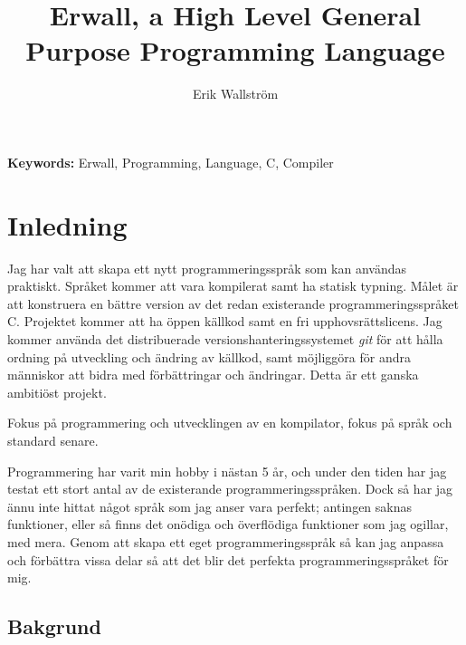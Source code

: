 \documentclass{theme}
\begin{document}
\title{Erwall, a High Level General Purpose Programming Language}
\subtitle{}
\author{Erik Wallström}
\maketitle
\newpage

\begin{abstract}
\end{abstract}

\begin{flushleft}
	{\small {\bf Keywords:} Erwall, Programming, Language, C, Compiler}
\end{flushleft}

\tableofcontents
{}
\newpage
{}

\section{Inledning}

Jag har valt att skapa ett nytt programmeringsspråk som kan användas praktiskt. 
Språket kommer att vara kompilerat samt ha statisk typning. Målet är att 
konstruera en bättre version av det redan existerande programmeringsspråket C. 
Projektet kommer att ha öppen källkod samt en fri upphovsrättslicens. Jag kommer
använda det distribuerade versionshanteringssystemet \textit{git} för att hålla 
ordning på utveckling och ändring av källkod, samt möjliggöra för andra 
människor att bidra med förbättringar och ändringar. Detta är ett ganska 
ambitiöst projekt.

Fokus på programmering och utvecklingen av en kompilator, fokus på språk och 
standard senare. 

Programmering har varit min hobby i nästan 5 år, och under den tiden har jag 
testat ett stort antal av de existerande programmeringsspråken. Dock så har jag 
ännu inte hittat något språk som jag anser vara perfekt; antingen saknas 
funktioner, eller så finns det onödiga och överflödiga funktioner som jag 
ogillar, med mera. Genom att skapa ett eget programmeringsspråk så kan jag 
anpassa och förbättra vissa delar så att det blir det perfekta 
programmeringsspråket för mig. 

\subsection{Bakgrund}
\end{document}
